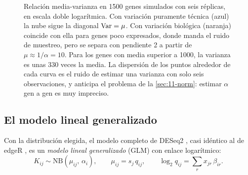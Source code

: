 \begin{figure}[t]
\centering
{}
\caption[Relación media-varianza]{Relación media-varianza en \num{1500} genes simulados con seis réplicas, en escala doble logarítmica. Con variación puramente técnica (azul) la nube sigue la diagonal $\operatorname{Var}=\mu$. Con variación biológica (naranja) coincide con ella para genes poco expresados, donde manda el ruido de muestreo, pero se separa con pendiente 2 a partir de $\mu\approx1/\alpha=10$. Para los genes con media superior a \num{1000}, la varianza es unas 330 veces la media. La dispersión de los puntos alrededor de cada curva es el ruido de estimar una varianza con solo seis observaciones, y anticipa el problema de la \cref{sec:11-norm}: estimar $\alpha$ gen a gen es muy impreciso.}
\label{fig:11-mediavar}
\end{figure}

\subsection{El modelo lineal generalizado}

Con la distribución elegida, el modelo completo de DESeq2 \parencite{c11-love2014}, casi idéntico al de edgeR \parencite{c11-robinson2010edger}, es un \emph{modelo lineal generalizado} (GLM) con enlace logarítmico:
\begin{equation}\label{eq:11-glm}
K_{ij}\sim\mathrm{NB}\!\left(\mu_{ij},\,\alpha_i\right),\qquad
\mu_{ij}=s_j\,q_{ij},\qquad
\log_2 q_{ij}=\sum_{r}x_{jr}\,\beta_{ir}.
\end{equation}

